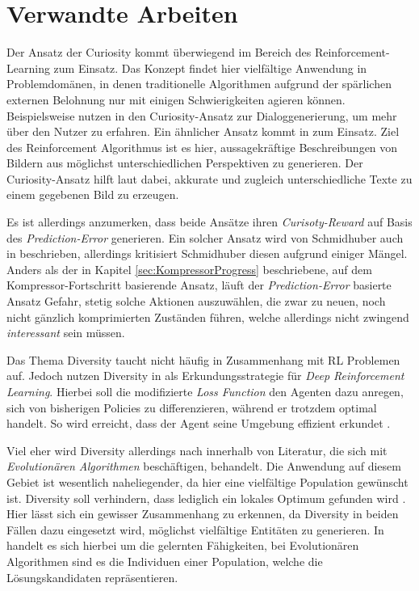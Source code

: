 
\section{Verwandte Arbeiten}
\label{sec:related}

Der Ansatz der Curiosity kommt überwiegend im Bereich des Reinforcement-Learning zum Einsatz. Das Konzept findet hier vielfältige Anwendung in Problemdomänen, in denen traditionelle Algorithmen aufgrund der spärlichen externen Belohnung nur mit einigen Schwierigkeiten agieren können. Beispielsweise nutzen \citeauthor{8683033} in \cite{8683033} den Curiosity-Ansatz zur Dialoggenerierung, um mehr über den Nutzer zu erfahren. Ein ähnlicher Ansatz kommt in \cite{luo2019curiositydriven} zum Einsatz. Ziel des Reinforcement Algorithmus ist es hier, aussagekräftige Beschreibungen von Bildern aus möglichst unterschiedlichen Perspektiven zu generieren. Der Curiosity-Ansatz hilft laut \citeauthor{luo2019curiositydriven} dabei, akkurate und zugleich unterschiedliche Texte zu einem gegebenen Bild zu erzeugen. 

Es ist allerdings anzumerken, dass beide Ansätze ihren \emph{Curisoty-Reward} auf Basis des \emph{Prediction-Error} generieren. Ein solcher Ansatz wird von Schmidhuber auch in \cite{curiosity_schmidhuber} beschrieben, allerdings kritisiert Schmidhuber diesen aufgrund einiger Mängel. Anders als der in Kapitel \ref{sec:KompressorProgress} beschriebene, auf dem Kompressor-Fortschritt basierende Ansatz, läuft der \emph{Prediction-Error} basierte Ansatz Gefahr, stetig solche Aktionen auszuwählen, die zwar zu neuen, noch nicht gänzlich komprimierten Zuständen führen, welche allerdings nicht zwingend \emph{interessant} sein müssen. \cite{curiosity_schmidhuber}

\smallspace

Das Thema Diversity taucht nicht häufig in Zusammenhang mit RL Problemen auf. Jedoch nutzen \citeauthor{hong2018diversity} Diversity in \cite{hong2018diversity} als Erkundungsstrategie für \textit{Deep Reinforcement Learning}. Hierbei soll die modifizierte \textit{Loss Function} den Agenten dazu anregen, sich von bisherigen Policies zu differenzieren, während er trotzdem optimal handelt. So wird erreicht, dass der Agent seine Umgebung effizient erkundet \cite{hong2018diversity}.

Viel eher wird Diversity allerdings nach \cite{gabor2018inheritance} innerhalb von Literatur, die sich mit \textit{Evolutionären Algorithmen} beschäftigen, behandelt. Die Anwendung auf diesem Gebiet ist wesentlich naheliegender, da hier eine vielfältige Population gewünscht ist. Diversity soll verhindern, dass lediglich ein lokales Optimum gefunden wird \cite{gabor2018inheritance}. Hier lässt sich ein gewisser Zusammenhang zu \cite{diversity_eysenbach} erkennen, da Diversity in beiden Fällen dazu eingesetzt wird, möglichst vielfältige Entitäten zu generieren. In \cite{diversity_eysenbach} handelt es sich hierbei um die gelernten Fähigkeiten, bei Evolutionären Algorithmen sind es die Individuen einer Population, welche die Lösungskandidaten repräsentieren.